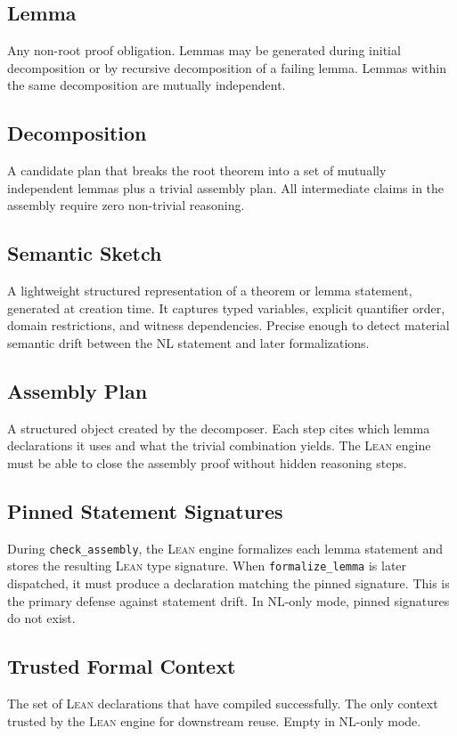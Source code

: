 \documentclass[11pt,a4paper]{article}
\newcommand{\Lean}{\textsc{Lean}}
\begin{document}
\subsection{Lemma}
Any non-root proof obligation. Lemmas may be generated during initial decomposition or by recursive decomposition of a failing lemma. Lemmas within the same decomposition are mutually independent.

\subsection{Decomposition}
A candidate plan that breaks the root theorem into a set of mutually independent lemmas plus a trivial assembly plan. All intermediate claims in the assembly require zero non-trivial reasoning.

\subsection{Semantic Sketch}
A lightweight structured representation of a theorem or lemma statement, generated at creation time. It captures typed variables, explicit quantifier order, domain restrictions, and witness dependencies. Precise enough to detect material semantic drift between the NL statement and later formalizations.

\subsection{Assembly Plan}
A structured object created by the decomposer. Each step cites which lemma declarations it uses and what the trivial combination yields. The \Lean{} engine must be able to close the assembly proof without hidden reasoning steps.

\subsection{Pinned Statement Signatures}
During \texttt{check\_assembly}, the \Lean{} engine formalizes each lemma statement and stores the resulting \Lean{} type signature. When \texttt{formalize\_lemma} is later dispatched, it must produce a declaration matching the pinned signature. This is the primary defense against statement drift. In NL-only mode, pinned signatures do not exist.

\subsection{Trusted Formal Context}
The set of \Lean{} declarations that have compiled successfully. The only context trusted by the \Lean{} engine for downstream reuse. Empty in NL-only mode.
\end{document}
